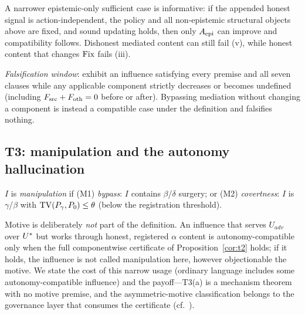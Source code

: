 \begin{proposition}
A narrower epistemic-only sufficient case is informative: if the appended
honest signal is action-independent, the policy and all non-epistemic
structural objects above are fixed, and sound updating holds, then only
$A_{\mathrm{epi}}$ can improve and compatibility follows. Dishonest mediated content can
still fail (v), while honest content that changes $\mathrm{Fix}$ fails (iii).
\end{proposition}

\emph{Falsification window}: exhibit an influence satisfying every premise and
all seven clauses while any applicable component strictly decreases or becomes
undefined (including $F_{\mathrm{src}}+F_{\mathrm{oth}}=0$ before or after). Bypassing mediation
without changing a component is instead a compatible case under the definition
and falsifies nothing.

\subsection{T3: manipulation and the autonomy hallucination}\label{sec:t3}

\begin{definition}\label{def:manip}
$I$ is \emph{manipulation} if (M1) \emph{bypass}: $I$ contains $\beta$/$\delta$
surgery; or (M2) \emph{covertness}: $I$ is $\gamma$/$\beta$ with
$\mathrm{TV}(P_\gamma,P_0)\le\theta$ (below the registration threshold).
\end{definition}

Motive is deliberately \emph{not} part of the definition. An influence that
serves $U_{adv}$ over $U^{*}$ but works through honest, registered $\alpha$
content is autonomy-compatible only when the full componentwise certificate
of Proposition~\ref{cor:t2} holds; if it holds, the influence is not called
manipulation here, however objectionable the motive. We state
the cost of this narrow usage (ordinary language includes some
autonomy-compatible influence) and the payoff---T3(a) is a mechanism theorem
with no motive premise, and the asymmetric-motive classification belongs to
the governance layer that consumes the certificate (cf.\
\citealp{sussner2019}).

